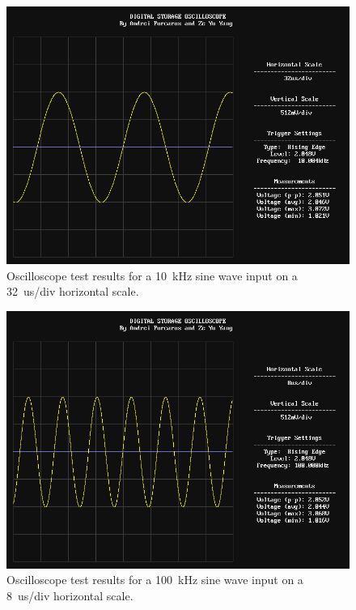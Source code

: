 \documentclass[journal]{IEEEtran}
\begin{document}
\begin{figure}[!htb]
  \centering
  \includegraphics[width=\columnwidth]{test-results/scope_demo_10kHz.png}
  \caption{Oscilloscope test results for a 10~kHz sine wave input on a 32~us/div horizontal scale.}
  \label{fig:scope_test_2}
\end{figure}

\begin{figure}[!htb]
  \centering
  \includegraphics[width=\columnwidth]{test-results/scope_demo_100kHz.png}
  \caption{Oscilloscope test results for a 100~kHz sine wave input on a 8~us/div horizontal scale.}
  \label{fig:scope_test_3}
\end{figure}
\end{document}
